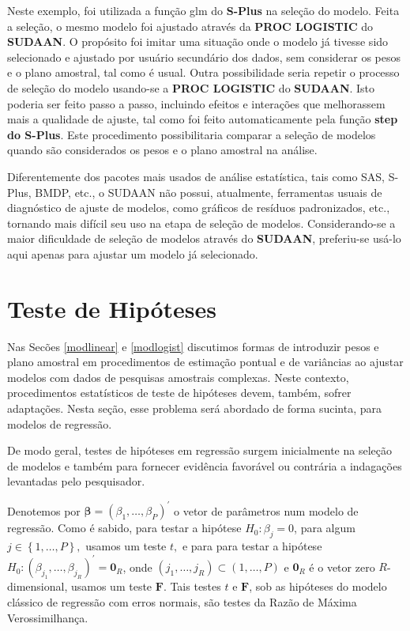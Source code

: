 \documentclass[]{book}
\numberwithin{example}{chapter}
\numberwithin{remark}{chapter}
\numberwithin{definition}{chapter}
\begin{document}
Neste exemplo, foi utilizada a função glm do \textbf{S-Plus} na seleção
do modelo. Feita a seleção, o mesmo modelo foi ajustado através da
\textbf{PROC LOGISTIC} do \textbf{SUDAAN}. O propósito foi imitar uma
situação onde o modelo já tivesse sido selecionado e ajustado por
usuário secundário dos dados, sem considerar os pesos e o plano
amostral, tal como é usual. Outra possibilidade seria repetir o processo
de seleção do modelo usando-se a \textbf{PROC LOGISTIC} do
\textbf{SUDAAN}. Isto poderia ser feito passo a passo, incluindo efeitos
e interações que melhorassem mais a qualidade de ajuste, tal como foi
feito automaticamente pela função \textbf{step do S-Plus}. Este
procedimento possibilitaria comparar a seleção de modelos quando são
considerados os pesos e o plano amostral na análise.

Diferentemente dos pacotes mais usados de análise estatística, tais como
SAS, S-Plus, BMDP, etc., o SUDAAN não possui, atualmente, ferramentas
usuais de diagnóstico de ajuste de modelos, como gráficos de resíduos
padronizados, etc., tornando mais difícil seu uso na etapa de seleção de
modelos. Considerando-se a maior dificuldade de seleção de modelos
através do \textbf{SUDAAN}, preferiu-se usá-lo aqui apenas para ajustar
um modelo já selecionado.

\section{Teste de Hipóteses}\label{teste-de-hipoteses}

Nas Secões \ref{modlinear} e \ref{modlogist} discutimos formas de
introduzir pesos e plano amostral em procedimentos de estimação pontual
e de variâncias ao ajustar modelos com dados de pesquisas amostrais
complexas. Neste contexto, procedimentos estatísticos de teste de
hipóteses devem, também, sofrer adaptações. Nesta seção, esse problema
será abordado de forma sucinta, para modelos de regressão.

De modo geral, testes de hipóteses em regressão surgem inicialmente na
seleção de modelos e também para fornecer evidência favorável ou
contrária a indagações levantadas pelo pesquisador.

Denotemos por
\(\mathbf{\beta }=\left( \beta _{1},\ldots ,\beta _{P}\right) ^{\prime }\)
o vetor de parâmetros num modelo de regressão. Como é sabido, para
testar a hipótese \(H_{0}:\beta _{j}=0\), para algum
\(j\in \left\{ 1,\ldots ,P\right\} \mathbf{,}\) usamos um teste \(t,\) e
para para testar a hipótese
\(H_{0}:\left( \beta _{j_{1}},\ldots ,\beta _{j_{R}}\right) ^{\prime }=\mathbf{0}_{R}\),
onde
\(\left( j_{1},\ldots ,j_{R}\right) \subset \left( 1,\ldots ,P\right)\)
e \(\mathbf{0}_{R}\) é o vetor zero \(R\)-dimensional, usamos um teste
\(\mathbf{F}\). Tais testes \(t\) e \(\mathbf{F}\), sob as hipóteses do
modelo clássico de regressão com erros normais, são testes da Razão de
Máxima Verossimilhança.
\end{document}
